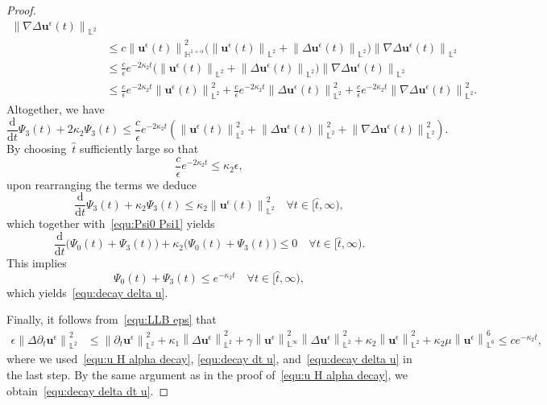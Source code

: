 \documentclass[11pt,reqno]{amsart}
\theoremstyle{definition}
\numberwithin{equation}{section}
\newcommand{\bff}{\boldsymbol}
\newcommand{\bb}{\mathbb}
\newcommand{\ddt}{\frac{\mathrm{d}}{\mathrm{d}t}}
\newcommand{\norm}[2]{\left\|{#1}\right\|_{#2}}
\begin{document}
\begin{proof}
\begin{align*}
		\norm{\nabla \Delta \bff{u}^\epsilon(t)}{\bb{L}^2}
		\\
		&\leq
		c 
		\norm{\bff{u}^\epsilon(t)}{\bb{H}^{1+\alpha}}^2 
		\Big(
		\norm{\bff{u}^\epsilon(t)}{\bb{L}^2} 
		+
		\norm{\Delta \bff{u}^\epsilon(t)}{\bb{L}^2} 
		\Big)
		\norm{\nabla \Delta \bff{u}^\epsilon(t)}{\bb{L}^2}
		\\
		&\leq
		\frac{c}{\epsilon} e^{-2 \kappa_2 t}
		\Big(
			\norm{\bff{u}^\epsilon(t)}{\bb{L}^2} 
			+
			\norm{\Delta \bff{u}^\epsilon(t)}{\bb{L}^2} 
		\Big)
		\norm{\nabla \Delta \bff{u}^\epsilon(t)}{\bb{L}^2}
		\\
		&\leq
		\frac{c}{\epsilon} e^{-2 \kappa_2 t} \norm{\bff{u}^\epsilon(t)}{\bb{L}^2}^2
		+
		\frac{c}{\epsilon} e^{-2 \kappa_2 t} \norm{\Delta \bff{u}^\epsilon(t)}{\bb{L}^2}^2
		+
		\frac{c}{\epsilon} e^{-2 \kappa_2 t}
		\norm{\nabla\Delta \bff{u}^\epsilon(t)}{\bb{L}^2}^2.
	\end{align*}
	Altogether, we have 
	\[
		\ddt \Psi_3(t)
		+
		2 \kappa_2 \Psi_3(t)
		\le
			\frac{c}{\epsilon} e^{-2 \kappa_2 t}
			\left( \norm{\bff{u}^\epsilon(t)}{\bb{L}^2}^2
			+
			\norm{\Delta \bff{u}^\epsilon(t)}{\bb{L}^2}^2
			+
			\norm{\nabla\Delta \bff{u}^\epsilon(t)}{\bb{L}^2}^2 \right).
	\]
	By choosing~$\hat t$ sufficiently large so that
	\[
		\frac{c}{\epsilon} e^{-2 \kappa_2 t}
		\le \kappa_2 \epsilon,
	\]
	upon rearranging the terms we deduce
	\[
		\ddt \Psi_3(t)
		+
		\kappa_2 \Psi_3(t)
		\le 
		\kappa_2
		\norm{\bff{u}^\epsilon(t)}{\bb{L}^2}^2
		\quad\forall t\in[\hat t,\infty),
	\]
	which together with~\eqref{equ:Psi0 Psi1} yields
	\[
		\ddt 
		\Big(\Psi_0(t) + \Psi_3(t) \Big)
		+
		\kappa_2 \Big(\Psi_0(t) + \Psi_3(t) \Big)
		\le 
		0
		\quad\forall t\in[\hat t,\infty).
	\]
	This implies
	\[
		\Psi_0(t) + \Psi_3(t) \le e^{- \kappa_2 t}
		\quad\forall t\in[\hat t,\infty),
	\]
	which yields~\eqref{equ:decay delta u}.
	

	
	Finally, it follows from~\eqref{equ:LLB eps} that
	\begin{align*}
		\epsilon \norm{\Delta \partial_t \bff{u}^\epsilon}{\bb{L}^2}^2
		&\leq
		\norm{\partial_t \bff{u}^\epsilon}{\bb{L}^2}^2
		+
		\kappa_1 \norm{\Delta \bff{u}^\epsilon}{\bb{L}^2}^2
		+
		\gamma \norm{\bff{u}^\epsilon}{\bb{L}^\infty}^2
		\norm{\Delta \bff{u}^\epsilon}{\bb{L}^2}^2
		+
		\kappa_2 \norm{\bff{u}^\epsilon}{\bb{L}^2}^2
		+
		\kappa_2 \mu \norm{\bff{u}^\epsilon}{\bb{L}^6}^6
		\leq
		ce^{-\kappa_2 t},
	\end{align*}
	where we used~\eqref{equ:u H alpha decay}, \eqref{equ:decay dt u}, and~\eqref{equ:decay delta u} in the last step. By the same argument as in the proof of~\eqref{equ:u H alpha decay}, we obtain~\eqref{equ:decay delta dt u}.
\end{proof}
\end{document}
